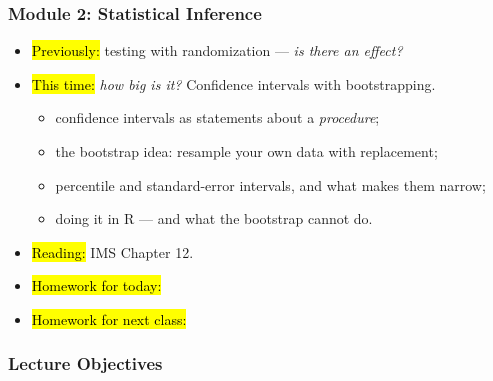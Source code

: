 

\begin{frame}
\frametitle{Module 2: Statistical Inference}
    \begin{itemize}
    	\item \hl{Previously:} testing with randomization --- \emph{is there an effect?}
        \item \hl{This time:} \emph{how big is it?} Confidence intervals with bootstrapping.
          \begin{itemize}
              \item confidence intervals as statements about a \emph{procedure};
              \item the bootstrap idea: resample your own data with replacement;
              \item percentile and standard-error intervals, and what makes them narrow;
              \item doing it in R --- and what the bootstrap cannot do.
          \end{itemize}
        \item \hl{Reading:} IMS Chapter 12.
        \item \hl{Homework for today:}
        \item \hl{Homework for next class:}
    \end{itemize}
\end{frame}


\begin{frame}
    \frametitle{Lecture Objectives}
\end{frame}
